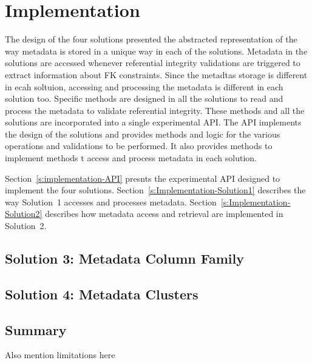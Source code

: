 \chapter{Implementation} \label{c:Implementation}

The design of the four solutions presented the abstracted representation of the
way metadata is stored in a unique way in each of the solutions. Metadata in the
solutions are accessed whenever referential integrity validations are triggered
to extract information about \ac{FK} constraints. Since the metadtas storage is
different in ecah soltuion, accessing and processing the  metadata is different
in each solution too.
Specific methods are designed in all the solutions to read and process the
metadata to validate referential integrity.  These methods and all the solutions
are incorporated into a single experimental \ac{API}. The \ac{API} implements
the design of the solutions and provides methods and logic for the various
operations and validations to be performed. It also provides methods to
implement methods t access and process metadata in each solution.

Section~\ref{s:implementation-API} presnts the experimental \ac{API} designed to
implement the four solutions. Section~\ref{s:Implementation-Solution1} describes
the way Solution~1 accesses and processes metadata.
Section~\ref{s:Implementation-Solution2} describes how metadata access and
retrieval are implemented in Solution~2. 



	


 

\section{Solution 3:  Metadata Column Family}\label{s:sol3}



\section{Solution 4:  Metadata Clusters}\label{s:sol4}

\section{Summary}\label{s:solutions-summary}
Also mention limitations here

